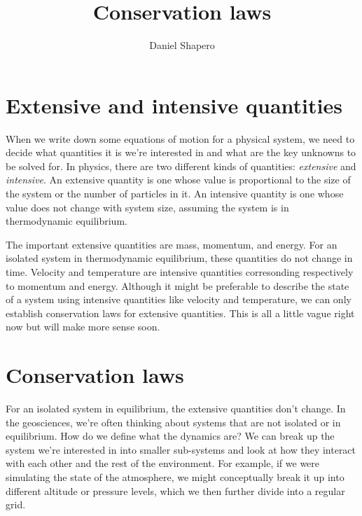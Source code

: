 \documentclass{article}
\title{Conservation laws}
\author{Daniel Shapero}
\date{}
\theoremstyle{definition}
\theoremstyle{plain}
\begin{document}
\maketitle

\section{Extensive and intensive quantities}

When we write down some equations of motion for a physical system, we need to decide what quantities it is we're interested in and what are the key unknowns to be solved for.
In physics, there are two different kinds of quantities: \emph{extensive} and \emph{intensive}.
An extensive quantity is one whose value is proportional to the size of the system or the number of particles in it.
An intensive quantity is one whose value does not change with system size, assuming the system is in thermodynamic equilibrium.

The important extensive quantities are mass, momentum, and energy.
For an isolated system in thermodynamic equilibrium, these quantities do not change in time.
Velocity and temperature are intensive quantities corresonding respectively to momentum and energy.
Although it might be preferable to describe the state of a system using intensive quantities like velocity and temperature, we can only establish conservation laws for extensive quantities.
This is all a little vague right now but will make more sense soon.


\section{Conservation laws}

For an isolated system in equilibrium, the extensive quantities don't change.
In the geosciences, we're often thinking about systems that are not isolated or in equilibrium.
How do we define what the dynamics are?
We can break up the system we're interested in into smaller sub-systems and look at how they interact with each other and the rest of the environment.
For example, if we were simulating the state of the atmosphere, we might conceptually break it up into different altitude or pressure levels, which we then further divide into a regular grid.
\end{document}
